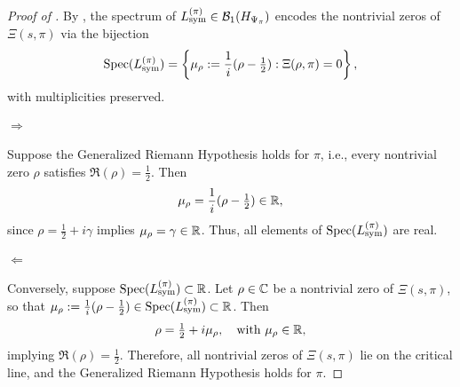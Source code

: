 \begin{proof}[Proof of ]
By , the spectrum of \( L_{\mathrm{sym}}^{(\pi)} \in \mathcal{B}_1(H_{\Psi_{\pi}}) \) encodes the nontrivial zeros of \( \Xi(s, \pi) \) via the bijection
\[
\operatorname{Spec}(L_{\mathrm{sym}}^{(\pi)}) = \left\{ \mu_\rho := \frac{1}{i}(\rho - \tfrac{1}{2}) : \Xi(\rho, \pi) = 0 \right\},
\]
with multiplicities preserved.

\paragraph{\( \Rightarrow \)} Suppose the Generalized Riemann Hypothesis holds for \( \pi \), i.e., every nontrivial zero \( \rho \) satisfies \( \Re(\rho) = \tfrac{1}{2} \). Then
\[
\mu_\rho = \frac{1}{i}(\rho - \tfrac{1}{2}) \in \mathbb{R},
\]
since \( \rho = \tfrac{1}{2} + i\gamma \) implies \( \mu_\rho = \gamma \in \mathbb{R} \). Thus, all elements of \( \operatorname{Spec}(L_{\mathrm{sym}}^{(\pi)}) \) are real.

\paragraph{\( \Leftarrow \)} Conversely, suppose \( \operatorname{Spec}(L_{\mathrm{sym}}^{(\pi)}) \subset \mathbb{R} \). Let \( \rho \in \mathbb{C} \) be a nontrivial zero of \( \Xi(s, \pi) \), so that \( \mu_\rho := \tfrac{1}{i}(\rho - \tfrac{1}{2}) \in \operatorname{Spec}(L_{\mathrm{sym}}^{(\pi)}) \subset \mathbb{R} \). Then
\[
\rho = \tfrac{1}{2} + i \mu_\rho, \quad \text{with } \mu_\rho \in \mathbb{R},
\]
implying \( \Re(\rho) = \tfrac{1}{2} \). Therefore, all nontrivial zeros of \( \Xi(s, \pi) \) lie on the critical line, and the Generalized Riemann Hypothesis holds for \( \pi \).
\end{proof}
